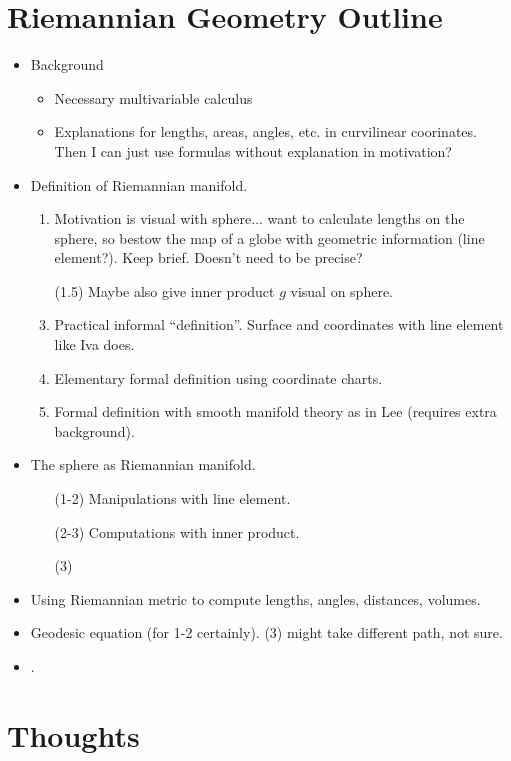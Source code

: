\documentclass{amsart}
\begin{document}
\section*{Riemannian Geometry Outline}
\begin{itemize}
	\item Background
	\begin{itemize}
		\item Necessary multivariable calculus
		\item Explanations for lengths, areas, angles, etc. in curvilinear coorinates. Then I can just use formulas without explanation in motivation?
	\end{itemize}
	\item Definition of Riemannian manifold.
	\begin{enumerate}
		\item Motivation is visual with sphere... want to calculate lengths on the sphere, so bestow the map of a globe with geometric information (line element?). Keep brief. Doesn't need to be precise?
		\item[(1.5)] Maybe also give inner product $g$ visual on sphere.
		\item Practical informal ``definition''. Surface and coordinates with line element like Iva does.
		\item Elementary formal definition using coordinate charts.
		\item Formal definition with smooth manifold theory as in Lee (requires extra background).
	\end{enumerate}
	\item The sphere as Riemannian manifold.
	\begin{enumerate}
		\item[(1-2)] Manipulations with line element.
		\item[(2-3)] Computations with inner product.
		\item[(3)]
	\end{enumerate}
	\item Using Riemannian metric to compute lengths, angles, distances, volumes.
	\item Geodesic equation (for 1-2 certainly). (3) might take different path, not sure.
	\item .
\end{itemize}

\section*{Thoughts}
\end{document}

